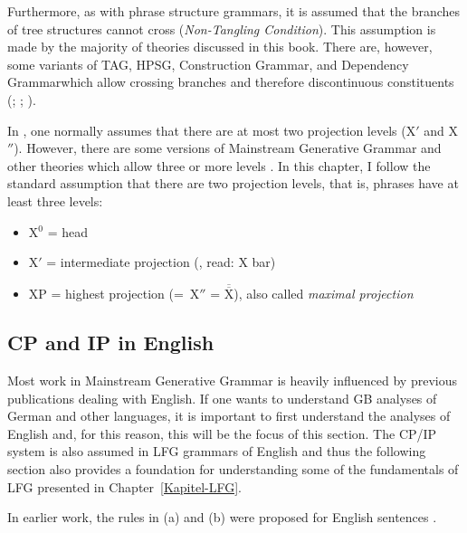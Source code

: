 Furthermore, as with phrase structure grammars, it is assumed that the branches of tree structures
cannot cross (\emph{Non-Tangling Condition}). This assumption is made by
the majority of theories discussed in this book. There are, however, some variants of TAG\indextag,
HPSG\indexhpsg, Construction Grammar\indexcxg, and Dependency Grammar\indexdg which allow crossing branches and therefore
discontinuous constituents
(\citealp*{BJR91a,Reape94a,BC2005a}; \citealp[]{Heringer96a-u}; \citealp[Section~9.6.2]{Eroms2000a}).

In \xbart, one normally assumes that there are at most two projection levels (X$'$ and X$''$). However, there are some versions of Mainstream
Generative Grammar and other theories which allow three or more levels \citep{Jackendoff77a,Uszkoreit87a}. In this chapter, I follow the
standard assumption that there are two projection levels, that is, phrases have at least three levels:

\begin{itemize}
\item X$^0$ = head
\item X$'$ = intermediate projection (\xbar, read: X bar) 
\item XP = highest projection (=~X$''$ = $\overline{\overline{\mbox{X}}}$), also called \emph{maximal projection} 
\end{itemize}

\subsection{CP and IP in English}
\label{Abschnitt-GB-CP-IP-System-Englisch}\label{sec-GB-CP-IP-System-English}

Most work in Mainstream Generative Grammar is heavily influenced by previous publications dealing with English. If one wants to understand GB analyses of
German and other languages, it is important to first understand the analyses of English and, for this reason, this will be the focus of this section.
The CP/IP system is also assumed in LFG grammars of English and thus the following section also provides a foundation for understanding some of the
fundamentals of LFG presented in Chapter~\ref{Kapitel-LFG}.

In earlier work, the rules in (a) and (b) were proposed for English sentences \citep[]{Chomsky81a}.

